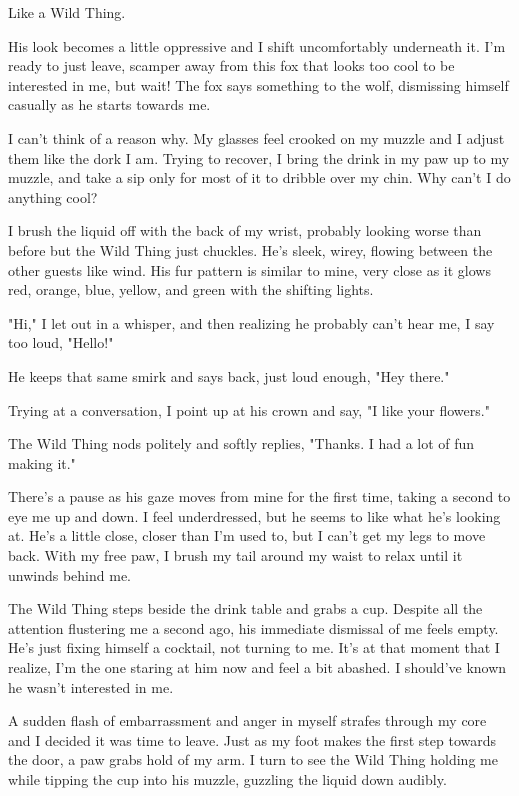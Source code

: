 Like a Wild Thing.

His look becomes a little oppressive and I shift uncomfortably underneath it. I'm ready to just leave, scamper away from this fox that looks too cool to be interested in me, but wait! The fox says something to the wolf, dismissing himself casually as he starts towards me.

I can't think of a reason why. My glasses feel crooked on my muzzle and I adjust them like the dork I am. Trying to recover, I bring the drink in my paw up to my muzzle, and take a sip only for most of it to dribble over my chin. Why can't I do anything cool?

I brush the liquid off with the back of my wrist, probably looking worse than before but the Wild Thing just chuckles. He's sleek, wirey, flowing between the other guests like wind. His fur pattern is similar to mine, very close as it glows red, orange, blue, yellow, and green with the shifting lights.

"Hi," I let out in a whisper, and then realizing he probably can't hear me, I say too loud, "Hello!"

He keeps that same smirk and says back, just loud enough, "Hey there."

Trying at a conversation, I point up at his crown and say, "I like your flowers."

The Wild Thing nods politely and softly replies, "Thanks. I had a lot of fun making it."

There's a pause as his gaze moves from mine for the first time, taking a second to eye me up and down. I feel underdressed, but he seems to like what he's looking at. He's a little close, closer than I'm used to, but I can't get my legs to move back. With my free paw, I brush my tail around my waist to relax until it unwinds behind me.

The Wild Thing steps beside the drink table and grabs a cup. Despite all the attention flustering me a second ago, his immediate dismissal of me feels empty. He's just fixing himself a cocktail, not turning to me. It's at that moment that I realize, I'm the one staring at him now and feel a bit abashed. I should've known he wasn't interested in me.

A sudden flash of embarrassment and anger in myself strafes through my core and I decided it was time to leave. Just as my foot makes the first step towards the door, a paw grabs hold of my arm. I turn to see the Wild Thing holding me while tipping the cup into his muzzle, guzzling the liquid down audibly.

